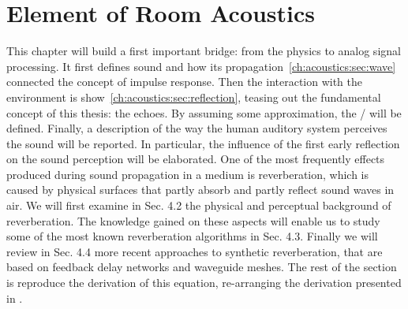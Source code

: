 \chapter{Element of Room Acoustics}\label{chap:acoustics}
\vspace{-2.5em}
This chapter will build a first important bridge: from the physics to analog signal processing.
It first defines sound and how its propagation~\cref{ch:acoustics:sec:wave} connected the concept of impulse response.
Then the interaction with the environment is show~\cref{ch:acoustics:sec:reflection}, teasing out the fundamental concept of this thesis: the echoes.
By assuming some approximation, the \RIRdef/ will be defined.
Finally, a description of the way the human auditory system perceives the sound will be reported.
In particular, the influence of the first early reflection on the sound perception will be elaborated.
One of the most frequently effects produced during sound propagation in a medium is reverberation,
which is caused by physical surfaces that partly absorb and partly reflect sound waves in air. We will first examine in Sec. 4.2 the physical and perceptual background of reverberation. The knowledge gained on these aspects will enable us to study some of the most known reverberation algorithms in Sec. 4.3. Finally we will review in Sec. 4.4 more recent approaches to synthetic reverberation, that are based on feedback delay networks and waveguide meshes.
The rest of the section is reproduce the derivation of this equation, re-arranging the derivation presented in \cite{kuttruff2016room, pierce2019acoustics, marczuk2006modelling, avanzini2019sound}.

